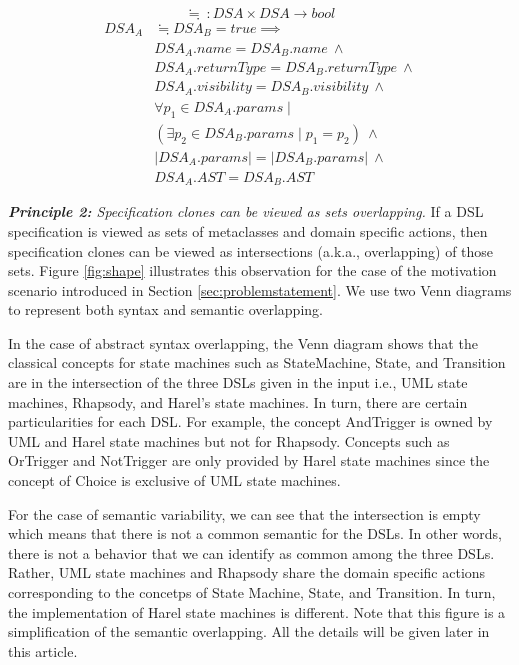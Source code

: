 \begin{equation}
  \fallingdotseq~: DSA \times DSA \rightarrow bool
\end{equation}
\vspace{-1mm}
\begin{equation}
\begin{split}
  DSA_{A} & \fallingdotseq DSA_{B} = true \implies \\
   & DSA_{A}.name = DSA_{B}.name ~ \wedge \\
   & DSA_{A}.returnType = DSA_{B}.returnType ~ \wedge \\
   & DSA_{A}.visibility = DSA_{B}.visibility ~ \wedge \\
   & \forall p_1 \in DSA_{A}.params \mid \\
   & (\exists p_2 \in DSA_{B}.params \mid p_1 = p_2)  ~ \wedge \\
   & |DSA_{A}.params| = |DSA_{B}.params|  ~ \wedge \\
   & DSA_{A}.AST = DSA_{B}.AST
 \end{split}
\end{equation}

\vspace{2mm}
\textit{\textbf{Principle 2:} Specification clones can be viewed as sets overlapping.} If a DSL specification is viewed as sets of metaclasses and domain specific actions, then specification clones can be viewed as intersections (a.k.a., overlapping) of those sets. Figure \ref{fig:shape} illustrates this observation for the case of the motivation scenario introduced in Section \ref{sec:problemstatement}. We use two Venn diagrams to represent both syntax and semantic overlapping.

In the case of abstract syntax overlapping, the Venn diagram shows that the classical concepts for state machines such as StateMachine, State, and Transition are in the intersection of the three DSLs given in the input i.e., UML state machines, Rhapsody, and Harel's state machines. In turn, there are certain particularities for each DSL. For example, the concept AndTrigger is owned by UML and Harel state machines but not for Rhapsody. Concepts such as OrTrigger and NotTrigger are only provided by Harel state machines since the concept of Choice is exclusive of UML state machines. 

For the case of semantic variability, we can see that the intersection is empty which means that there is not a common semantic for the DSLs. In other words, there is not a behavior that we can identify as common among the three DSLs. Rather, UML state machines and Rhapsody share the domain specific actions corresponding to the concetps of State Machine, State, and Transition. In turn, the implementation of Harel state machines is different. Note that this figure is a simplification of the semantic overlapping. All the details will be given later in this article. 

